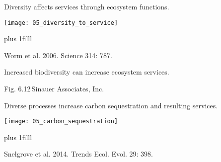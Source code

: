\documentclass[t]{beamer}
\begin{document}
%
\begin{frame}[t]{Diversity affects services through ecosystem functions.}

		\texttt{[image: 05\_diversity\_to\_service]}
		
	\vskip0pt plus 1filll
	
	\hfill\tiny Worm et al. 2006. Science 314: 787.

\end{frame}
%
{
\begin{frame}[b]{Increased biodiversity can increase ecosystem services.}


\hfill\tiny Fig. 6.12\,\textcopyright Sinauer Associates, Inc.
\end{frame}
}
%
\begin{frame}[t]{Diverse processes increase carbon sequestration and resulting services.}

		\vspace*{-0.85\baselineskip}
		
		\texttt{[image: 05\_carbon\_sequestration]}
		
	\vskip0pt plus 1filll
	
	\hfill\tiny Snelgrove et al. 2014. Trends Ecol. Evol.  29: 398.

\end{frame}
\end{document}
